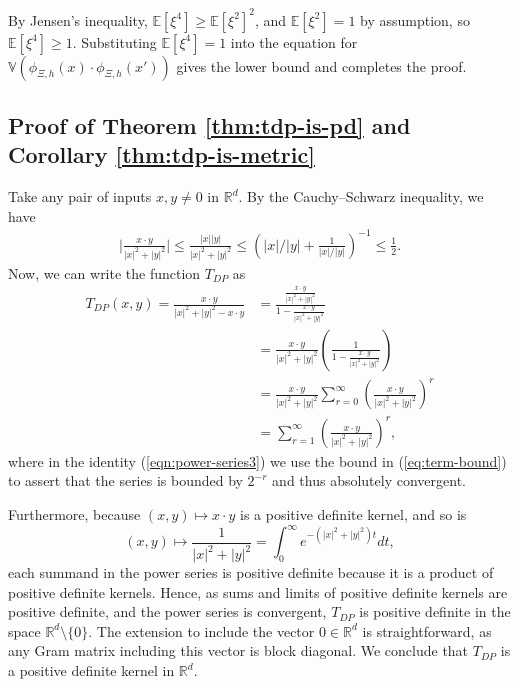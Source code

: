 \documentclass{article}
\theoremstyle{plain}
\theoremstyle{definition}
\theoremstyle{remark}
\newcommand{\numeq}[1]{\begin{align}#1\end{align}}
\newcommand{\E}{\mathbb{E}}
\newcommand{\R}{\mathbb{R}}
\begin{document}
By Jensen's inequality, $\E[\xi^4]\geq \E[\xi^2]^2$, and $\E[\xi^2]=1$ by assumption, so $\E[\xi^4]\geq1$.
    Substituting $\E[\xi^4]=1$ into the equation for $\mathbb{V}(\phi_{\Xi,h}(x)\cdot \phi_{\Xi,h}(x'))$ gives the lower bound and completes the proof.

\subsection{Proof of Theorem \ref{thm:tdp-is-pd} and Corollary \ref{thm:tdp-is-metric}}\label{apdx:tdp-is-pd-proof}

Take any pair of inputs $x,y\neq 0$ in $\R^d$. By the Cauchy--Schwarz inequality, we have
\numeq{ \label{eq:term-bound}
\Bigg| \frac{x\cdot y}{|x|^2 + |y|^2} \Bigg|\leq \frac{|x||y|}{|x|^2 + |y|^2} \leq \left(|x|/|y| + \frac{1}{|x|/|y|} \right)^{-1} \leq \frac{1}{2}.
}
Now, we can write the function $T_{DP}$ as
\begin{align}
    T_{DP}(x,y) = \frac{x\cdot y}{|x|^2 + |y|^2 - x\cdot y} &= \frac{\frac{x\cdot y}{|x|^2 + |y|^2}}{1 - \frac{x\cdot y}{|x|^2 + |y|^2}} \label{eqn:power-series1} \\
    &= \frac{x\cdot y}{|x|^2 + |y|^2}\left(\frac{1}{1 - \frac{x\cdot y}{|x|^2 + |y|^2}}\right) \label{eqn:power-series2} \\
    &= \frac{x\cdot y}{|x|^2 + |y|^2} \sum_{r=0}^\infty \left(\frac{x\cdot y}{|x|^2 + |y|^2}\right)^r \label{eqn:power-series3} \\
    &= \sum_{r=1}^\infty \left(\frac{x\cdot y}{|x|^2 + |y|^2}\right)^r \label{eqn:power-series},
\end{align}
where in the identity (\ref{eqn:power-series3}) we use the bound in (\ref{eq:term-bound}) to assert that the series is bounded by $2^{-r}$ and thus absolutely convergent.

Furthermore, because $(x,y)\mapsto x\cdot y$ is a positive definite kernel, and so is
$$(x,y)\mapsto \frac{1}{|x|^2+|y|^2 } = \int_{0}^\infty  e^{-(|x|^2+|y|^2)t}  dt,$$
each summand in the power series is positive definite because it is a product of positive definite kernels.
Hence, as sums and limits of positive definite kernels are positive definite, and the power series is convergent, $T_{DP}$ is positive definite in the space $\R^d\setminus \{0\}$. The extension to include the vector $0\in\R^d$ is straightforward, as any Gram matrix including this vector is block diagonal. We conclude that $T_{DP}$ is a positive definite kernel in $\R^d$. 
\end{document}
